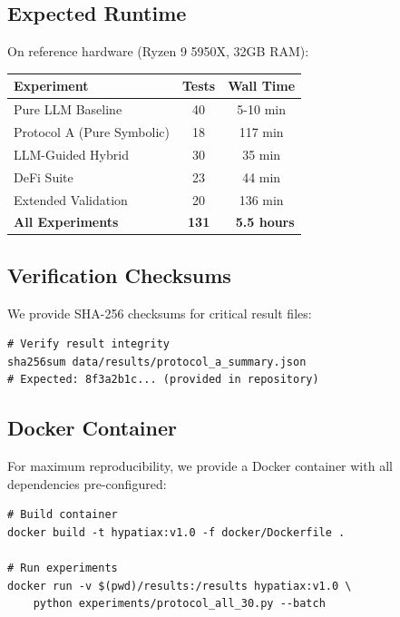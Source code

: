 \subsection{Expected Runtime}

On reference hardware (Ryzen 9 5950X, 32GB RAM):

\begin{table}[H]
\centering
\begin{tabular}{@{}lcc@{}}
\toprule
\textbf{Experiment} & \textbf{Tests} & \textbf{Wall Time} \\
\midrule
Pure LLM Baseline & 40 & 5-10 min \\
Protocol A (Pure Symbolic) & 18 & 117 min \\
LLM-Guided Hybrid & 30 & 35 min \\
DeFi Suite & 23 & 44 min \\
Extended Validation & 20 & 136 min \\
\midrule
\textbf{All Experiments} & \textbf{131} & \textbf{~5.5 hours} \\
\bottomrule
\end{tabular}
\end{table}

\subsection{Verification Checksums}

We provide SHA-256 checksums for critical result files:

\begin{small}
\begin{verbatim}
# Verify result integrity
sha256sum data/results/protocol_a_summary.json
# Expected: 8f3a2b1c... (provided in repository)
\end{verbatim}
\end{small}

\subsection{Docker Container}

For maximum reproducibility, we provide a Docker container with all dependencies pre-configured:

\begin{small}
\begin{verbatim}
# Build container
docker build -t hypatiax:v1.0 -f docker/Dockerfile .

# Run experiments
docker run -v $(pwd)/results:/results hypatiax:v1.0 \
    python experiments/protocol_all_30.py --batch
\end{verbatim}
\end{small}

